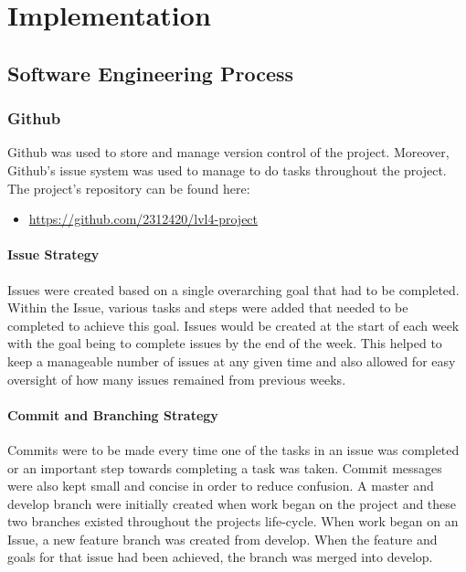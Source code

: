 \chapter{Implementation}
\label{Implementation}



    \section{Software Engineering Process}
    
        \subsection{Github}
        Github \citep{website:Github} was used to store and manage version control of the project. Moreover, Github's issue system was used to manage to do tasks throughout the project. The project's repository can be found here:
        \begin{itemize}
            \item \url{https://github.com/2312420/lvl4-project} 
        \end{itemize}
          
            \subsubsection{Issue Strategy}
            Issues were created based on a single overarching goal that had to be completed. Within the Issue, various tasks and steps were added that needed to be completed to achieve this goal. Issues would be created at the start of each week with the goal being to complete issues by the end of the week. This helped to keep a manageable number of issues at any given time and also allowed for easy oversight of how many issues remained from previous weeks. 
            
            \subsubsection{Commit and Branching Strategy}
            Commits were to be made every time one of the tasks in an issue was completed or an important step towards completing a task was taken. Commit messages were also kept small and concise in order to reduce confusion. A master and develop branch were initially created when work began on the project and these two branches existed throughout the projects life-cycle. When work began on an Issue, a new feature branch was created from develop. When the feature and goals for that issue had been achieved, the branch was merged into develop.
            
